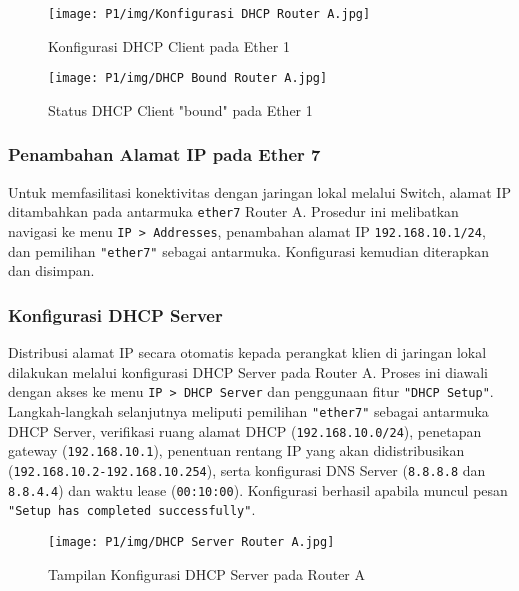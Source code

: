 \begin{figure}[H]
    \centering
    \begin{minipage}[t]{0.48\textwidth}
        \centering
        \texttt{[image: P1/img/Konfigurasi DHCP Router A.jpg]}
        \caption{Konfigurasi DHCP Client pada Ether 1}
        \label{fig:dhcp_client_config}
    \end{minipage}
    \hfill
    \begin{minipage}[t]{0.48\textwidth}
        \centering
        \texttt{[image: P1/img/DHCP Bound Router A.jpg]}
        \caption{Status DHCP Client "bound" pada Ether 1}
        \label{fig:dhcp_client_bound}
    \end{minipage}
\end{figure}

\subsubsection*{Penambahan Alamat IP pada Ether 7}
Untuk memfasilitasi konektivitas dengan jaringan lokal melalui Switch, alamat IP ditambahkan pada antarmuka \texttt{ether7} Router A. Prosedur ini melibatkan navigasi ke menu \texttt{IP > Addresses}, penambahan alamat IP \texttt{192.168.10.1/24}, dan pemilihan \texttt{"ether7"} sebagai antarmuka. Konfigurasi kemudian diterapkan dan disimpan.

\subsubsection*{Konfigurasi DHCP Server}
Distribusi alamat IP secara otomatis kepada perangkat klien di jaringan lokal dilakukan melalui konfigurasi DHCP Server pada Router A. Proses ini diawali dengan akses ke menu \texttt{IP > DHCP Server} dan penggunaan fitur \texttt{"DHCP Setup"}. Langkah-langkah selanjutnya meliputi pemilihan \texttt{"ether7"} sebagai antarmuka DHCP Server, verifikasi ruang alamat DHCP (\texttt{192.168.10.0/24}), penetapan gateway (\texttt{192.168.10.1}), penentuan rentang IP yang akan didistribusikan (\texttt{192.168.10.2-192.168.10.254}), serta konfigurasi DNS Server (\texttt{8.8.8.8} dan \texttt{8.8.4.4}) dan waktu lease (\texttt{00:10:00}). Konfigurasi berhasil apabila muncul pesan \texttt{"Setup has completed successfully"}.

\begin{figure}[H]
    \centering
    \texttt{[image: P1/img/DHCP Server Router A.jpg]} %
    \caption{Tampilan Konfigurasi DHCP Server pada Router A}
    \label{fig:dhcp_server_router_a}
\end{figure}

